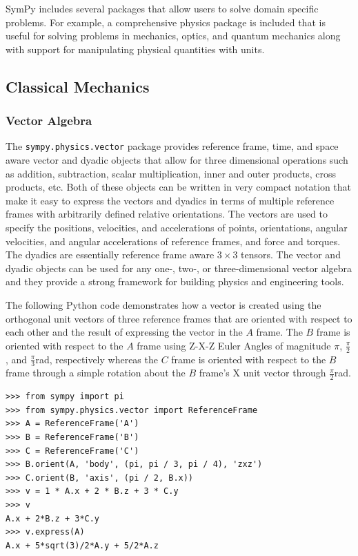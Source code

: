 SymPy includes several packages that allow users to solve domain specific
problems. For example, a comprehensive physics package is included that is
useful for solving problems in mechanics, optics, and quantum
mechanics along with support for manipulating physical quantities with units.


\subsection{Classical Mechanics}

\subsubsection{Vector Algebra}

The \verb|sympy.physics.vector| package provides reference frame, time, and
space aware vector and dyadic objects that allow for three dimensional
operations such as addition, subtraction, scalar multiplication, inner and
outer products, cross products, etc. Both of these objects can be written in
very compact notation that make it easy to express the vectors and dyadics in
terms of multiple reference frames with arbitrarily defined relative
orientations. The vectors are used to specify the positions, velocities, and
accelerations of points, orientations, angular velocities, and angular
accelerations of reference frames, and force and torques. The dyadics are
essentially reference frame aware $3 \times 3$ tensors. The vector and dyadic
objects can be used for any one-, two-, or three-dimensional vector algebra and
they provide a strong framework for building physics and engineering tools.

The following Python code demonstrates how a vector is created using
the orthogonal unit vectors of three reference frames that are oriented with
respect to each other and the result of expressing the vector in the $A$
frame. The $B$ frame is oriented with respect to the $A$ frame using Z-X-Z
Euler Angles of magnitude $\pi$, $\frac{\pi}{2}$, and
$\frac{\pi}{3}$\si{\radian}, respectively whereas the $C$ frame is oriented
with respect to the $B$ frame through a simple rotation about the $B$ frame's
X unit vector through $\frac{\pi}{2}$\si{\radian}.

\begin{verbatim}
>>> from sympy import pi
>>> from sympy.physics.vector import ReferenceFrame
>>> A = ReferenceFrame('A')
>>> B = ReferenceFrame('B')
>>> C = ReferenceFrame('C')
>>> B.orient(A, 'body', (pi, pi / 3, pi / 4), 'zxz')
>>> C.orient(B, 'axis', (pi / 2, B.x))
>>> v = 1 * A.x + 2 * B.z + 3 * C.y
>>> v
A.x + 2*B.z + 3*C.y
>>> v.express(A)
A.x + 5*sqrt(3)/2*A.y + 5/2*A.z
\end{verbatim}

